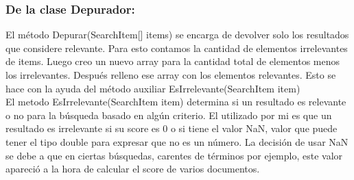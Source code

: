 \documentclass{article}
\begin{document}
\subsubsection{De la clase Depurador:}
El método Depurar(SearchItem[] items) se encarga de devolver solo los resultados que considere relevante. Para esto contamos la cantidad de elementos irrelevantes de items. Luego creo un nuevo array para la cantidad total de elementos menos los irrelevantes. Después relleno ese array con los elementos relevantes. Esto se hace con la ayuda del método auxiliar EsIrrelevante(SearchItem item)\\
El metodo EsIrrelevante(SearchItem item) determina si un resultado es relevante o no para la búsqueda basado en algún criterio. El utilizado por mi es que un resultado es irrelevante si su score es 0 o si tiene el valor NaN, valor que puede tener el tipo double para expresar que no es un número. La decisión de usar NaN se debe a que en ciertas búsquedas, carentes de términos por ejemplo, este valor apareció a la hora de calcular el score de varios documentos.\\
\end{document}
